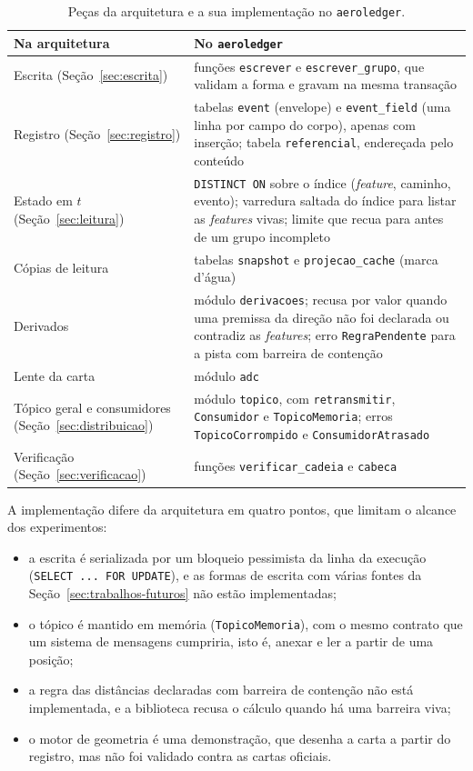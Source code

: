 \begin{table}[htbp]
    \centering
    \caption{Peças da arquitetura e a sua implementação no \texttt{aeroledger}.}
    \label{tab:implementacao}
    \begin{tabularx}{\linewidth}{l X}
        \toprule
        Na arquitetura & No \texttt{aeroledger} \\
        \midrule
        Escrita (Seção~\ref{sec:escrita}) & funções \texttt{escrever} e \texttt{escrever\_grupo}, que validam a forma e gravam na mesma transação \\
        Registro (Seção~\ref{sec:registro}) & tabelas \texttt{event} (envelope) e \texttt{event\_field} (uma linha por campo do corpo), apenas com inserção; tabela \texttt{referencial}, endereçada pelo conteúdo \\
        Estado em $t$ (Seção~\ref{sec:leitura}) & \texttt{DISTINCT ON} sobre o índice (\textit{feature}, caminho, evento); varredura saltada do índice para listar as \textit{features} vivas; limite que recua para antes de um grupo incompleto \\
        Cópias de leitura & tabelas \texttt{snapshot} e \texttt{projecao\_cache} (marca d'água) \\
        Derivados & módulo \texttt{derivacoes}; recusa por valor quando uma premissa da direção não foi declarada ou contradiz as \textit{features}; erro \texttt{RegraPendente} para a pista com barreira de contenção \\
        Lente da carta & módulo \texttt{adc} \\
        Tópico geral e consumidores (Seção~\ref{sec:distribuicao}) & módulo \texttt{topico}, com \texttt{retransmitir}, \texttt{Consumidor} e \texttt{TopicoMemoria}; erros \texttt{TopicoCorrompido} e \texttt{ConsumidorAtrasado} \\
        Verificação (Seção~\ref{sec:verificacao}) & funções \texttt{verificar\_cadeia} e \texttt{cabeca} \\
        \bottomrule
    \end{tabularx}
    \par{}
\end{table}

A implementação difere da arquitetura em quatro pontos, que limitam o alcance dos experimentos:
\begin{itemize}
    \item a escrita é serializada por um bloqueio pessimista da linha da execução (\texttt{SELECT ... FOR UPDATE}), e as formas de escrita com várias fontes da Seção~\ref{sec:trabalhos-futuros} não estão implementadas;
    \item o tópico é mantido em memória (\texttt{TopicoMemoria}), com o mesmo contrato que um sistema de mensagens cumpriria, isto é, anexar e ler a partir de uma posição;
    \item a regra das distâncias declaradas com barreira de contenção não está implementada, e a biblioteca recusa o cálculo quando há uma barreira viva;
    \item o motor de geometria é uma demonstração, que desenha a carta a partir do registro, mas não foi validado contra as cartas oficiais.
\end{itemize}


